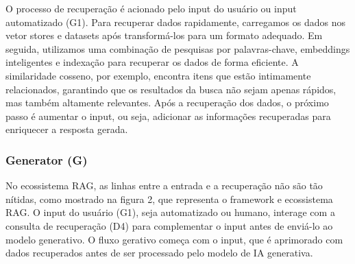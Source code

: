 \documentclass[a4paper, 12pt]{article}
\begin{document}
\begin{enumerate}
        O processo de recuperação é acionado pelo input do usuário ou input automatizado (G1). Para recuperar dados rapidamente, carregamos os dados nos vetor stores e datasets após transformá-los para um formato adequado. Em seguida, utilizamos uma combinação de pesquisas por palavras-chave, embeddings inteligentes e indexação para recuperar os dados de forma eficiente. 
        A similaridade cosseno, por exemplo, encontra itens que estão intimamente relacionados, garantindo que os resultados da busca não sejam apenas rápidos, mas também altamente relevantes.
        Após a recuperação dos dados, o próximo passo é aumentar o input, ou seja, adicionar as informações recuperadas para enriquecer a resposta gerada.
    \end{enumerate}

    \subsubsection{Generator (G)}

    No ecossistema RAG, as linhas entre a entrada e a recuperação não são tão nítidas, como mostrado na figura 2, que representa o framework e ecossistema RAG. O input do usuário (G1), seja automatizado ou humano, interage com a consulta de recuperação (D4) para complementar o input antes de enviá-lo ao modelo generativo. O fluxo gerativo começa com o input, que é aprimorado com dados recuperados antes de ser processado pelo modelo de IA generativa.
\end{document}

